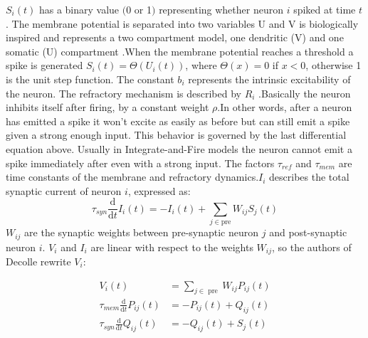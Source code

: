 \documentclass[12pt]{report}
\begin{document}
$S_{i}(t)$ has a binary value $(0$ or 1$)$ representing whether neuron $i$ spiked at time $t$ . The membrane potential is separated into two variables U and V is biologically inspired and represents a two compartment model, one dendritic (V) and one somatic (U) compartment .When the membrane potential reaches a threshold a spike is generated 
$S_{i}(t)=\Theta\left(U_{i}(t)\right)$, where $\Theta(x)=0$ if $x<0$, otherwise 1 is the unit step function. The constant $b_{i}$ represents the intrinsic excitability of the neuron. The refractory mechanism is described by $R_{i}$ .Basically the neuron inhibits itself after firing, by a constant weight $\rho$.In other words, after a neuron has emitted a spike it won't excite as easily as before but can still emit a spike given a strong enough input. This behavior is governed by the last differential equation above. Usually in Integrate-and-Fire models the neuron cannot emit a spike immediately after even with a strong input. The factors $\tau_{r e f}$ and $\tau_{m e m}$ are time constants of the membrane and refractory dynamics.$I_{i}$ describes the total synaptic current of neuron $i$, expressed as:
\begin{equation}
\tau_{s y n} \frac{\mathrm{d}}{\mathrm{d} t} I_{i}(t)=-I_{i}(t)+\sum_{j \in \mathrm{pre}} W_{i j} S_{j}(t)
\end{equation}
$W_{i j}$ are the synaptic weights between pre-synaptic neuron $j$ and post-synaptic neuron $i$. $V_{i}$ and $I_{i}$ are linear with respect to the weights $W_{i j}$, so the authors of Decolle rewrite $V_{i}$:

\begin{equation}
\begin{aligned}
V_{i}(t) &=\sum_{j \in \text { pre }} W_{i j} P_{i j}(t) \\
\tau_{m e m} \frac{\mathrm{d}}{\mathrm{d} t} P_{i j}(t) &=-P_{i j}(t)+Q_{i j}(t) \\
\tau_{s y n} \frac{\mathrm{d}}{\mathrm{d} t} Q_{i j}(t) &=-Q_{i j}(t)+S_{j}(t)
\end{aligned}
\end{equation}
\end{document}
